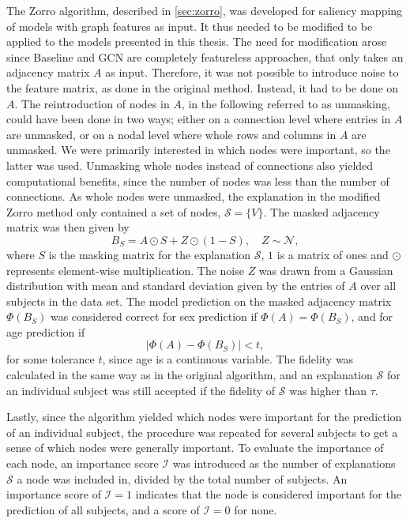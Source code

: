 The Zorro algorithm, described in \cref{sec:zorro}, was developed for saliency mapping of models with graph features as input. It thus needed to be modified to be applied to the models presented in this thesis. The need for modification arose since Baseline and GCN are completely featureless approaches, that only takes an adjacency matrix $A$ as input. Therefore, it was not possible to introduce noise to the feature matrix, as done in the original method. Instead, it had to be done on $A$. The reintroduction of nodes in $A$, in the following referred to as unmasking, could have been done in two ways; either on a connection level where entries in $A$ are unmasked, or on a nodal level where whole rows and columns in $A$ are unmasked. We were primarily interested in which nodes were important, so the latter was used. Unmasking whole nodes instead of connections also yielded computational benefits, since the number of nodes was less than the number of connections. As whole nodes were unmasked, the explanation in the modified Zorro method only contained a set of nodes, $\mathcal{S} = \{V\}$. The masked adjacency matrix was then given by 
\begin{equation}
    B_S = A \odot S + Z \odot (1- S), \quad Z \sim \mathcal{N},
\end{equation}
where $S$ is the masking matrix for the explanation $\mathcal{S}$, $1$ is a matrix of ones and $\odot$ represents element-wise multiplication. The noise $Z$ was drawn from a Gaussian distribution with mean and standard deviation given by the entries of $A$ over all subjects in the data set. The model prediction on the masked adjacency matrix $\Phi(B_S)$ was considered correct for sex prediction if $\Phi(A) = \Phi(B_S)$, and for age prediction if
\begin{equation}
    \left|\Phi(A) - \Phi(B_S)\right| < t,
\end{equation}
for some tolerance $t$, since age is a continuous variable.  The fidelity was calculated in the same way as in the original algorithm, and an explanation $\mathcal{S}$ for an individual subject was still accepted if the fidelity of $\mathcal{S}$ was higher than $\tau$. 

Lastly, since the algorithm yielded which nodes were important for the prediction of an individual subject, the procedure was repeated for several subjects to get a sense of which nodes were generally important. To evaluate the importance of each node, an importance score $\mathcal{I}$ was introduced as the number of explanations $\mathcal{S}$ a node was included in, divided by the total number of subjects. An importance score of $\mathcal{I}=1$ indicates that the node is considered important for the prediction of all subjects, and a score of $\mathcal{I}=0$ for none.  